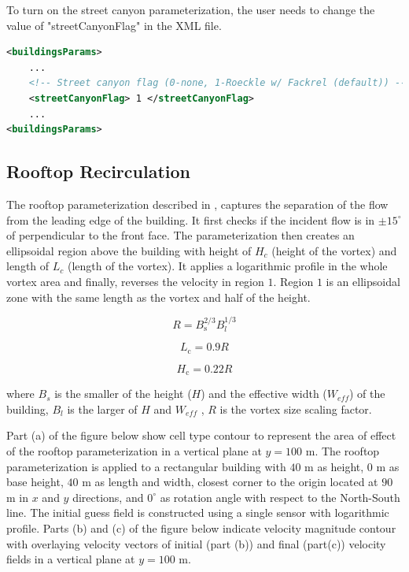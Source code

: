 To turn on the street canyon parameterization, the user needs to change the value of "streetCanyonFlag" in the XML file.

\begin{lstlisting}[language=XML]
<buildingsParams>
	...
	<!-- Street canyon flag (0-none, 1-Roeckle w/ Fackrel (default)) -->
	<streetCanyonFlag> 1 </streetCanyonFlag>
	...
<buildingsParams>
\end{lstlisting}

\subsection{Rooftop Recirculation}

The rooftop parameterization described in \cite{bagal2004implementation,pol2006implementation}, captures the separation of the flow from the leading edge of the building. It first checks if the incident flow is in $\pm15^{\circ}$ of perpendicular to the front face. The parameterization then creates an ellipsoidal region above the building with height of $H_c$ (height of the vortex) and length of $L_c$ (length of the vortex). It applies a logarithmic profile in the whole vortex area and finally, reverses the velocity in region $1$. Region $1$ is an ellipsoidal zone with the same length as the vortex and half of the height.

\begin{equation}
R=B_{\mathrm{s}}^{2 / 3} B_{l}^{1 / 3}
\end{equation}

\begin{equation}
L_{\mathrm{c}}=0.9 R
\label{eq:Lc}
\end{equation}

\begin{equation}
H_{\mathrm{c}}=0.22 R
\label{eq:Hc}
\end{equation}

where $B_s$ is the smaller of the height ($H$) and the effective width ($W_{eff}$) of the
building, $B_l$ is the larger of $H$ and $W_{eff}$ , $R$ is the vortex size scaling factor.

Part (a) of the figure below show cell type contour to represent the area of effect of the rooftop parameterization in a vertical plane at $y=100$ m. The rooftop parameterization is applied to a rectangular building with $40$ m as height, $0$ m as base height, $40$ m as length and width, closest corner to the origin located at $90$ m in $x$ and $y$ directions, and $0^{\circ}$ as rotation angle with respect to the North-South line. The initial guess field is constructed using a single sensor with logarithmic profile. Parts (b) and (c) of the figure below indicate velocity magnitude contour with overlaying velocity vectors of initial (part (b)) and final (part(c)) velocity fields in a vertical plane at $y=100$ m.

